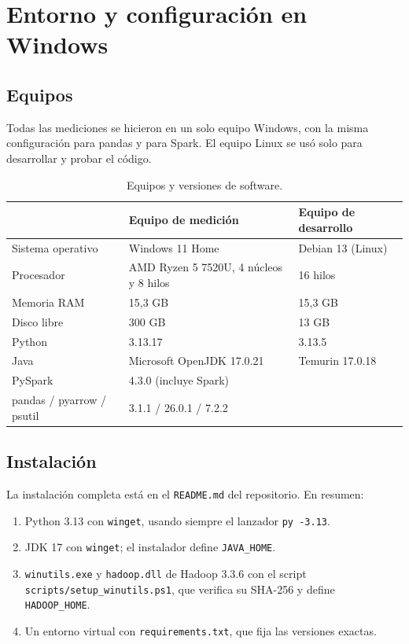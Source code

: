 \documentclass[11pt,a4paper]{article}
\begin{document}
\section{Entorno y configuración en Windows}

\subsection{Equipos}

Todas las mediciones se hicieron en un solo equipo Windows, con la misma configuración para
pandas y para Spark. El equipo Linux se usó solo para desarrollar y probar el código.

\begin{table}[H]
\centering
\caption{Equipos y versiones de software.}
\label{tab:entorno}
\begin{tabularx}{\textwidth}{lXX}
\toprule
 & Equipo de medición & Equipo de desarrollo \\
\midrule
Sistema operativo & Windows 11 Home & Debian 13 (Linux) \\
Procesador & AMD Ryzen 5 7520U, 4 núcleos y 8 hilos & 16 hilos \\
Memoria RAM & 15,3 GB & 15,3 GB \\
Disco libre & 300 GB & 13 GB \\
Python & 3.13.17 & 3.13.5 \\
Java & Microsoft OpenJDK 17.0.21 & Temurin 17.0.18 \\
\midrule
PySpark & \multicolumn{2}{l}{4.3.0 (incluye Spark)} \\
pandas / pyarrow / psutil & \multicolumn{2}{l}{3.1.1 / 26.0.1 / 7.2.2} \\
\bottomrule
\end{tabularx}
\end{table}

\subsection{Instalación}

La instalación completa está en el \texttt{README.md} del repositorio. En resumen:

\begin{enumerate}
  \item Python 3.13 con \texttt{winget}, usando siempre el lanzador \texttt{py -3.13}.
  \item JDK 17 con \texttt{winget}; el instalador define \texttt{JAVA\_HOME}.
  \item \texttt{winutils.exe} y \texttt{hadoop.dll} de Hadoop 3.3.6 con el script
  \texttt{scripts/setup\_winutils.ps1}, que verifica su SHA-256 y define
  \texttt{HADOOP\_HOME}.
  \item Un entorno virtual con \texttt{requirements.txt}, que fija las versiones exactas.
\end{enumerate}
\end{document}
